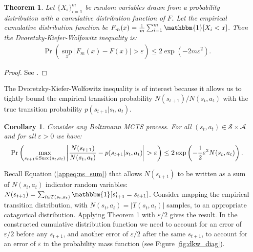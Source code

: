 \documentclass{article}
\newcommand{\cl}[1]{\mathcal{#1}}
\newcommand{\succc}[2]{\textnormal{Succ}(#1,#2)}
\newcommand{\one}{\mathbbm{1}}
\theoremstyle{plain}
\newtheorem{theorem}{Theorem}[section]
\newtheorem{corollary}{Corollary}[theorem]
\newenvironment{proofoutline}{\proof[Proof outline]}{\endproof}
\begin{document}
\begin{appendices}
        
    
        \begin{theorem} \label{thrm:dkw_inequality}
            Let $\{X_i\}_{i=1}^m$ be random variables drawn from a probability distribution with a cumulative distribution function of $F$. Let the empirical cumulative distribution function be $F_m(x)=\frac{1}{m} \sum_{i=1}^m \one[X_i < x]$. Then the Dvoretzky-Kiefer-Wolfowitz inequality is:
            \begin{align}
                \Pr\left(\sup_x |F_m(x)-F(x)| > \varepsilon\right) \leq 2\exp\left(-2m\varepsilon^2\right).
            \end{align}
        \end{theorem}
        \begin{proof}
            See .
        \end{proof}







        
    
        The Dvoretzky-Kiefer-Wolfowitz inequality is of interest because it allows us to tightly bound the empirical transition probability $N(s_{t+1})/N(s_t,a_t)$ with the true transition probability $p(s_{t+1}|s_t,a_t)$. 
        \begin{corollary} \label{cor:bound_transition_distribution}
            Consider any Boltzmann MCTS process. For all $(s_t,a_t)\in\cl{S}\times\cl{A}$ and for all $\varepsilon >0$ we have:
            \begin{align}
                \Pr\left(\max_{s_{t+1}\in\succc{s_t}{a_t}}\left| \frac{N(s_{t+1})}{N(s_t,a_t)} - p(s_{t+1}|s_t,a_t) \right| > \varepsilon \right) \leq 2 \exp\left(-\frac{1}{2}\varepsilon^2 N(s_t,a_t) \right).
            \end{align}
        \end{corollary}
        \begin{proofoutline}
            Recall Equation (\ref{appeq:ns_sum}) that allows $N(s_{t+1})$ to be written as a sum of $N(s_t,a_t)$ indicator random variables: $N(s_{t+1}) = \sum_{i\in T(s_t,a_t)} \one[s^i_{t+1} = s_{t+1}]$. Consider mapping the empirical transition distribution, with $N(s_t,a_t)=|T(s_t,a_t)|$ samples, to an appropriate catagorical distribution. Applying Theorem \ref{thrm:dkw_inequality} with $\varepsilon/2$ gives the result. In the constructed cumulative distribution function we need to account for an error of $\varepsilon/2$ before any $s_{t+1}$, and another error of $\varepsilon/2$ after the same $s_{t+1}$, to account for an error of $\varepsilon$ in the probability mass function (see Figure \ref{fig:dkw_diag}).
        \end{proofoutline}
        

\end{appendices}
\end{document}

